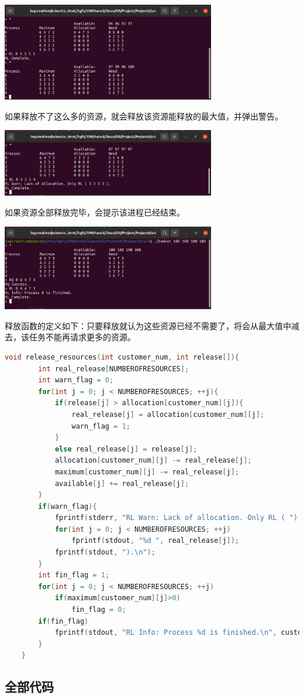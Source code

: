 \documentclass[12pt,a4paper]{article}
\newenvironment{problems}{\begin{list}{}{\renewcommand{\makelabel}[1]{\textbf{##1}\hfil}}}{\end{list}}
\providecommand{\code}[2]{}
\begin{document}
\begin{problems}
    \includegraphics[width=0.7\textwidth]{RLs.png}

    如果释放不了这么多的资源，就会释放该资源能释放的最大值，并弹出警告。

    \includegraphics[width=0.7\textwidth]{RLo.png}

    如果资源全部释放完毕，会提示该进程已经结束。

    \includegraphics[width=0.7\textwidth]{RLf.png}
    
    释放函数的定义如下：只要释放就认为这些资源已经不需要了，将会从最大值中减去，该任务不能再请求更多的资源。
    \begin{lstlisting}[language=c]
    void release_resources(int customer_num, int release[]){
        int real_release[NUMBEROFRESOURCES];
        int warn_flag = 0;
        for(int j = 0; j < NUMBEROFRESOURCES; ++j){
            if(release[j] > allocation[customer_num][j]){
                real_release[j] = allocation[customer_num][j];
                warn_flag = 1;
            }
            else real_release[j] = release[j];
            allocation[customer_num][j] -= real_release[j];
            maximum[customer_num][j] -= real_release[j];
            available[j] += real_release[j];
        }
        if(warn_flag){
            fprintf(stderr, "RL Warn: Lack of allocation. Only RL ( ");
            for(int j = 0; j < NUMBEROFRESOURCES; ++j)
                fprintf(stdout, "%d ", real_release[j]);
            fprintf(stdout, ").\n");
        }
        int fin_flag = 1;
        for(int j = 0; j < NUMBEROFRESOURCES; ++j)
            if(maximum[customer_num][j]>0)
                fin_flag = 0;
        if(fin_flag)
            fprintf(stdout, "RL Info: Process %d is finished.\n", customer_num);
        }
    }
    \end{lstlisting}
\end{problems}

\begin{appendices}
    \section{全部代码}
    \code{src/Makefile}{}
    \code{src/banker.c}{c}
    \code{src/info.txt}{}
\end{appendices}
\end{document}
